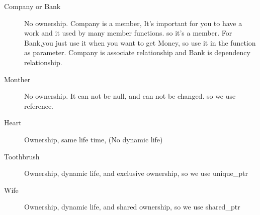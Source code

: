 \documentclass[a4paper,11pt,twoside]{book}
\begin{document}
\begin{itemize}
\begin{description}
	\item[Company or Bank] No ownership. Company is a member, It's important for you to have a work and it used by many member functions. so it's a member. For Bank,you just use it when you want to get Money, so use it in the function as parameter. Company is associate relationship and Bank is dependency relationship.
	
	\item[Monther] No ownership. It can not be null, and can not be changed.  so we use reference. 
	
	\item[Heart] Ownership, same life time, (No dynamic life)
	
	\item [Toothbrush] Ownership, dynamic life, and exclusive ownership, so we use unique\_ptr
	
	\item [Wife] Ownership, dynamic life, and shared ownership, so we use shared\_ptr
\end{description}


\end{itemize}
\end{document}
